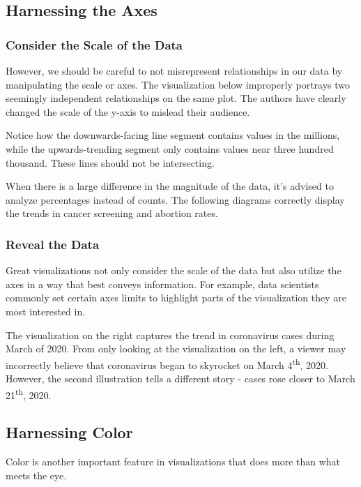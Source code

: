 \documentclass[
  letterpaper,
  DIV=11,
  numbers=noendperiod]{scrreprt}
\begin{document}
\subsection{Harnessing the Axes}\label{harnessing-the-axes}

\subsubsection{Consider the Scale of the
Data}\label{consider-the-scale-of-the-data}

However, we should be careful to not misrepresent relationships in our
data by manipulating the scale or axes. The visualization below
improperly portrays two seemingly independent relationships on the same
plot. The authors have clearly changed the scale of the y-axis to
mislead their audience.

Notice how the downwards-facing line segment contains values in the
millions, while the upwards-trending segment only contains values near
three hundred thousand. These lines should not be intersecting.

When there is a large difference in the magnitude of the data, it's
advised to analyze percentages instead of counts. The following diagrams
correctly display the trends in cancer screening and abortion rates.

\subsubsection{Reveal the Data}\label{reveal-the-data}

Great visualizations not only consider the scale of the data but also
utilize the axes in a way that best conveys information. For example,
data scientists commonly set certain axes limits to highlight parts of
the visualization they are most interested in.

The visualization on the right captures the trend in coronavirus cases
during March of 2020. From only looking at the visualization on the
left, a viewer may incorrectly believe that coronavirus began to
skyrocket on March 4\textsuperscript{th}, 2020. However, the second
illustration tells a different story - cases rose closer to March
21\textsuperscript{th}, 2020.

\subsection{Harnessing Color}\label{harnessing-color}

Color is another important feature in visualizations that does more than
what meets the eye.
\end{document}
